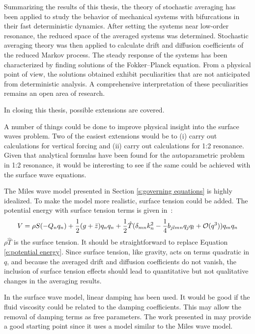 Summarizing the results of this thesis, the theory of stochastic averaging has been applied to study the behavior of mechanical systems with bifurcations in their fast deterministic dynamics. After setting the systems near low-order resonance, the reduced space of the averaged systems was determined. Stochastic averaging theory was then applied to calculate drift and diffusion coefficients of the reduced Markov process. The steady response of the systems has been characterized by finding solutions of the Fokker--Planck equation. From a physical point of view, the solutions obtained exhibit peculiarities that are not anticipated from deterministic analysis. A comprehensive interpretation of these peculiarities remains an open area of research.

In closing this thesis, possible extensions are covered.

A number of things could be done to improve physical insight into the surface waves problem. Two of the easiest extensions would be to (i) carry out calculations for vertical forcing and (ii) carry out calculations for 1:2 resonance. Given that analytical formulas have been found for the autoparametric problem in 1:2 resonance, it would be interesting to see if the same could be achieved with the surface wave equations.

The Miles wave model presented in Section \ref{s:governing equations} is highly idealized. To make the model more realistic, surface tension could be added. The potential energy with surface tension terms is given in~\citet{miles90:_param_forced_surfac_waves}:
\[
V = \rho S(-Q_n q_n) + \frac12(g + \ddot{z}) q_n q_n + \frac12 \hat{T} (\delta_{mn} k^2_n - \frac{1}{4} b_{jlmn} q_j q_l + \mathcal{O}(q^3)) q_m q_n
\]
$\rho \hat{T}$ is the surface tension. It should be straightforward to replace Equation \eqref{e:potential energy}. Since surface tension, like gravity, acts on terms quadratic in $q$, and because the averaged drift and diffusion coefficients do not vanish, the inclusion of surface tension effects should lead to quantitative but not qualitative changes in the averaging results.

In the surface wave model, linear damping has been used. It would be good if the fluid viscosity could be related to the damping coefficients. This may allow the removal of damping terms as free parameters. The work presented in \citet{vega01:_nearl_invis_farad_waves} may provide a good starting point since it uses a model similar to the Miles wave model.

